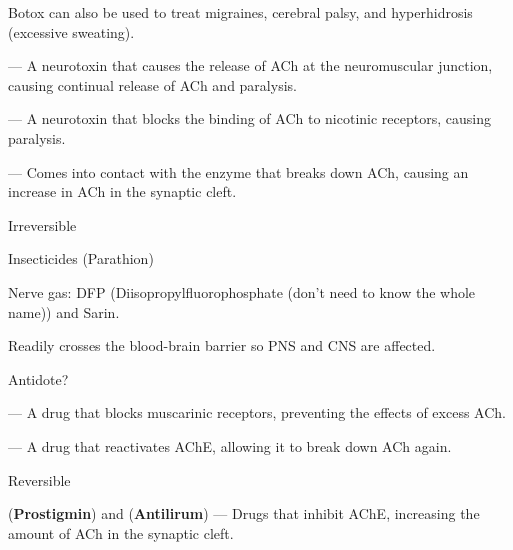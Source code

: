 \begin{coloredlist}
\begin{coloredlist}
        \item Botox can also be used to treat migraines, cerebral palsy, and hyperhidrosis (excessive sweating).
    \end{coloredlist}
    \item {} — A neurotoxin that causes the release of ACh at the neuromuscular junction, causing continual release of ACh and paralysis.
    \item {} — A neurotoxin that blocks the binding of ACh to nicotinic receptors, causing paralysis.
    \item {} — Comes into contact with the enzyme that breaks down ACh, causing an increase in ACh in the synaptic cleft.
    \begin{coloredlist}
        \item Irreversible
        \begin{coloredlist}
            \item Insecticides (Parathion)
            \item Nerve gas: DFP (Diisopropylfluorophosphate (don't need to know the whole name)) and Sarin.
            \begin{coloredlist}
                \item Readily crosses the blood-brain barrier so PNS and CNS are affected.
                \item Antidote?
                \begin{coloredlist}
                    \item {} — A drug that blocks muscarinic receptors, preventing the effects of excess ACh.
                    \item {} — A drug that reactivates AChE, allowing it to break down ACh again.
                \end{coloredlist}
            \end{coloredlist}
        \end{coloredlist}
        \item Reversible
        \begin{coloredlist}
            \item {} (\textbf{Prostigmin}) and  (\textbf{Antilirum}) — Drugs that inhibit AChE, increasing the amount of ACh in the synaptic cleft.

\end{coloredlist}
\end{coloredlist}
\end{coloredlist}
